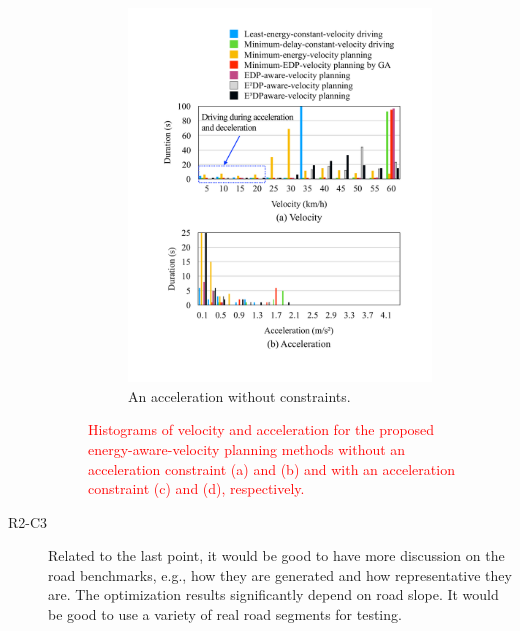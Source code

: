 \documentclass[onecolumn]{IEEEconf}
\begin{document}
\begin{description}
\begin{figure}[h!]
\begin{subfigure}{0.45\textwidth}
	\includegraphics[width=\hsize]{Figures/Histogram_acc.pdf}
	\caption{An acceleration without constraints.}
	\label{fig:histogram_acc}
	\end{subfigure}
\caption{\textcolor{red}{Histograms of velocity and acceleration for the proposed energy-aware-velocity planning methods without an acceleration constraint (a) and (b) and with an acceleration constraint (c) and (d), respectively.}}
\label{fig:histogram}
\end{figure}

\item [R2-C3] Related to the last point, it would be good to have more discussion on the road benchmarks, e.g., how they are generated and how representative they are. The optimization results significantly depend on road slope. It would be good to use a variety of real road segments for testing.


\end{description}
\end{document}
